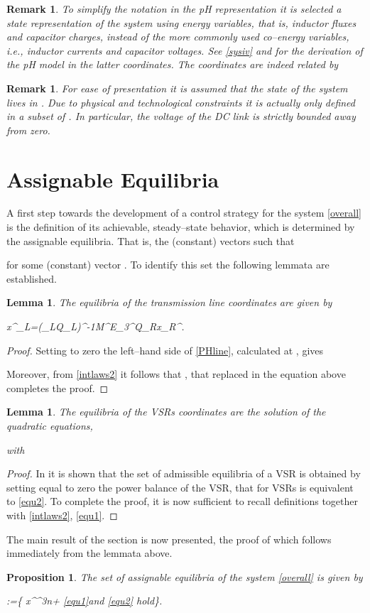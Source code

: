 \documentclass[5p,twocolumn]{elsarticle}
\def\begequ{}
\def\lab{\label}
\def\begrem{\begin{remark}\rm}
\def\endrem{\end{remark}}
\newtheorem{lemma}[theorem]{Lemma}
\newtheorem{proposition}[theorem]{Proposition}
\newtheorem{remark}[theorem]{Remark}
\numberwithin{equation}{section}
\begin{document}
\begrem
To simplify the notation in the pH representation it is selected a state representation of the system using energy variables, that is, inductor fluxes and capacitor charges, instead of the more commonly used
co--energy variables, {\em i.e.}, inductor currents and capacitor voltages. See \eqref{sysiv} and \cite{perez} for the derivation of the pH model in the latter coordinates. The coordinates are indeed related by

\endrem

\begrem
For ease of presentation it is assumed that the state of the system lives in . Due to physical and technological constraints it is actually only defined in a subset of
. In particular, the voltage of the DC link  is strictly bounded away from zero.
\endrem
\section{Assignable Equilibria}
\label{sssection}
A first step towards the development of a control strategy for the system \eqref{overall} is the definition of its achievable, steady--state behavior, which is determined by the assignable
equilibria. That is, the (constant) vectors  such that

for some (constant) vector . To identify this set the following lemmata are established.

\begin{lemma}\em
\lab{lem1}
The equilibria of the transmission line coordinates are given by
\begequ
\lab{equ1}
x^\star _L=(_LQ_L)^{-1}M^\top E_3^\top Q_Rx_R^\star.
\endequ
\end{lemma}
\begin{proof}
Setting to zero the left--hand side of \eqref{PHline}, calculated at , gives

Moreover, from \eqref{intlaws2} it follows that , that replaced in the equation above completes the proof.
\end{proof}

\begin{lemma}\em
\lab{lem2}
The equilibria of the VSRs coordinates are the solution of the  quadratic equations, 
\begequ
\lab{equ2}\resizebox{1\hsize}{!}{}
\endequ
with 
\end{lemma}
\begin{proof}
In \cite{sanchez} it is shown that the set of admissible equilibria of a VSR is obtained by setting equal to zero the power balance of the VSR, that for  VSRs is equivalent to \eqref{equ2}. To complete the proof, it is now sufficient to recall definitions  together with \eqref{intlaws2}, \eqref{equ1}.
\end{proof}
The main result of the section is now presented, the proof of which follows immediately from the lemmata above.
\begin{proposition}\em
\label{prop}
The set of assignable equilibria of the system \eqref{overall} is given by
\begequ
{}:=\{ x^\star  \in{}^{3n+\ell}\;\vert \; \eqref{equ1}\;\mbox{and}\; \eqref{equ2}\; \mbox{hold}\}.
\endequ

\end{proposition}
\end{document}

